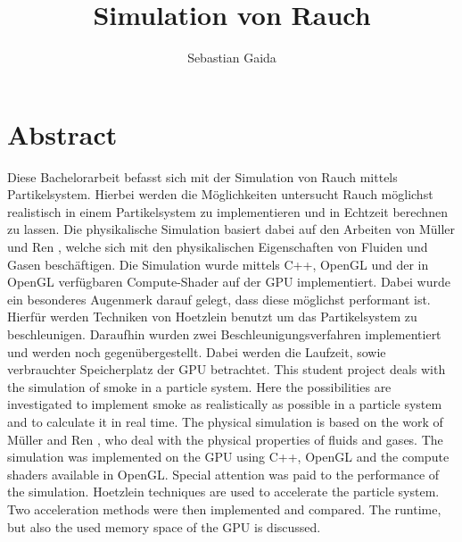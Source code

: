\documentclass[intern,palatino]{cgBA}
\author{Sebastian Gaida}
\title{Simulation von Rauch}
\begin{document}
	\maketitle
	\newpage
	
	
	
	\section*{Abstract}\label{abstract}
	
	Diese Bachelorarbeit befasst sich mit der Simulation von Rauch mittels Partikelsystem. Hierbei werden die Möglichkeiten untersucht Rauch möglichst realistisch in einem Partikelsystem zu implementieren und in Echtzeit berechnen zu lassen. Die physikalische Simulation basiert dabei auf den Arbeiten von  Müller \cite{muller2003particle} und Ren \cite{ren2016fast}, welche sich mit den physikalischen Eigenschaften von Fluiden und Gasen beschäftigen. Die Simulation wurde mittels C++, OpenGL und der in OpenGL verfügbaren Compute-Shader auf der GPU implementiert. Dabei wurde ein besonderes Augenmerk darauf gelegt, dass diese möglichst performant ist. Hierfür werden Techniken von Hoetzlein \cite{nvidia} benutzt um das Partikelsystem zu beschleunigen. Daraufhin wurden zwei Beschleunigungsverfahren implementiert und werden noch gegenübergestellt. Dabei werden die Laufzeit, sowie verbrauchter Speicherplatz der GPU betrachtet.
	\newline \newline
	This student project deals with the simulation of smoke in a particle system. Here the possibilities are investigated to implement smoke as realistically as possible in a particle system and to calculate it in real time. The physical simulation is based on the work of Müller \cite{muller2003particle} and Ren \cite{ren2016fast}, who deal with the physical properties of fluids and gases. The simulation was implemented on the GPU using C++, OpenGL and the compute shaders available in OpenGL. Special attention was paid to the performance of the simulation. Hoetzlein \cite{nvidia} techniques are used to accelerate the particle system. Two acceleration methods were then implemented and compared. The runtime, but also the used memory space of the GPU is discussed.
	
	\newpage
	
	\tableofcontents
	\clearpage
	
	\captionsetup{font=it}
\end{document}
